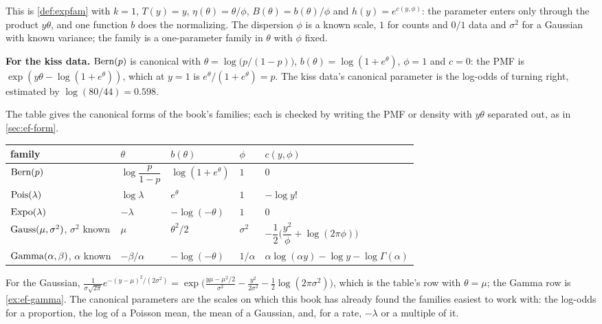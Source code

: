 \begin{inwords}
This is \cref{def:expfam} with $k = 1$, $T(y) = y$, $\eta(\theta) = \theta/\phi$, $B(\theta) = b(\theta)/\phi$ and $h(y) = e^{c(y, \phi)}$: the parameter enters only through the product $y\theta$, and one function $b$ does the normalizing. The dispersion $\phi$ is a known scale, $1$ for counts and $0/1$ data and $\sigma^2$ for a Gaussian with known variance; the family is a one-parameter family in $\theta$ with $\phi$ fixed.

\textbf{For the kiss data.} $\text{Bern}(p)$ is canonical with $\theta = \log\big(p/(1-p)\big)$, $b(\theta) = \log(1 + e^\theta)$, $\phi = 1$ and $c = 0$: the PMF is $\exp(y\theta - \log(1 + e^\theta))$, which at $y = 1$ is $e^\theta/(1 + e^\theta) = p$. The kiss data's canonical parameter is the log-odds of turning right, estimated by $\log(80/44) = 0.598$.
\end{inwords}

The table gives the canonical forms of the book's families; each is checked by writing the PMF or density with $y\theta$ separated out, as in \cref{sec:ef-form}.

\begin{center}
\small
\begin{tabular}{@{}lllll@{}}
\toprule
family & $\theta$ & $b(\theta)$ & $\phi$ & $c(y, \phi)$ \\
\midrule
$\text{Bern}(p)$ & $\log\dfrac{p}{1-p}$ & $\log(1 + e^\theta)$ & $1$ & $0$ \\[6pt]
$\text{Pois}(\lambda)$ & $\log\lambda$ & $e^\theta$ & $1$ & $-\log y!$ \\[4pt]
$\text{Expo}(\lambda)$ & $-\lambda$ & $-\log(-\theta)$ & $1$ & $0$ \\[4pt]
$\text{Gauss}(\mu, \sigma^2)$, $\sigma^2$ known & $\mu$ & $\theta^2/2$ & $\sigma^2$ & $-\dfrac12\Big(\dfrac{y^2}{\phi} + \log(2\pi\phi)\Big)$ \\[6pt]
$\mathrm{Gamma}(\alpha, \beta)$, $\alpha$ known & $-\beta/\alpha$ & $-\log(-\theta)$ & $1/\alpha$ & $\alpha\log(\alpha y) - \log y - \log\Gamma(\alpha)$ \\
\bottomrule
\end{tabular}
\end{center}

For the Gaussian, $\frac{1}{\sigma\sqrt{2\pi}}e^{-(y - \mu)^2/(2\sigma^2)} = \exp\big(\frac{y\mu - \mu^2/2}{\sigma^2} - \frac{y^2}{2\sigma^2} - \frac12\log(2\pi\sigma^2)\big)$, which is the table's row with $\theta = \mu$; the Gamma row is \cref{ex:ef-gamma}.
The canonical parameters are the scales on which this book has already found the families easiest to work with: the log-odds for a proportion, the log of a Poisson mean, the mean of a Gaussian, and, for a rate, $-\lambda$ or a multiple of it.

